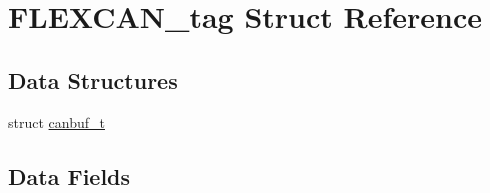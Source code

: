 \hypertarget{structFLEXCAN__tag}{}\section{F\+L\+E\+X\+C\+A\+N\+\_\+tag Struct Reference}
\label{structFLEXCAN__tag}
\subsection*{Data Structures}
\begin{DoxyCompactItemize}
\item 
struct \mbox{\hyperlink{structFLEXCAN__tag_1_1canbuf__t}{canbuf\+\_\+t}}
\end{DoxyCompactItemize}
\subsection*{Data Fields}
